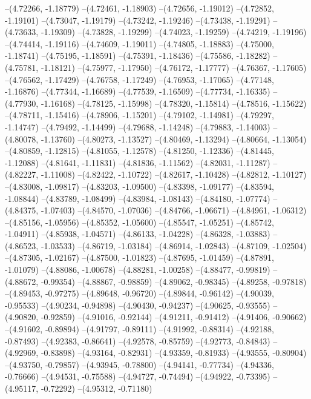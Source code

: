--(4.72266, -1.18779)
--(4.72461, -1.18903)
--(4.72656, -1.19012)
--(4.72852, -1.19101)
--(4.73047, -1.19179)
--(4.73242, -1.19246)
--(4.73438, -1.19291)
--(4.73633, -1.19309)
--(4.73828, -1.19299)
--(4.74023, -1.19259)
--(4.74219, -1.19196)
--(4.74414, -1.19116)
--(4.74609, -1.19011)
--(4.74805, -1.18883)
--(4.75000, -1.18741)
--(4.75195, -1.18591)
--(4.75391, -1.18436)
--(4.75586, -1.18282)
--(4.75781, -1.18121)
--(4.75977, -1.17950)
--(4.76172, -1.17777)
--(4.76367, -1.17605)
--(4.76562, -1.17429)
--(4.76758, -1.17249)
--(4.76953, -1.17065)
--(4.77148, -1.16876)
--(4.77344, -1.16689)
--(4.77539, -1.16509)
--(4.77734, -1.16335)
--(4.77930, -1.16168)
--(4.78125, -1.15998)
--(4.78320, -1.15814)
--(4.78516, -1.15622)
--(4.78711, -1.15416)
--(4.78906, -1.15201)
--(4.79102, -1.14981)
--(4.79297, -1.14747)
--(4.79492, -1.14499)
--(4.79688, -1.14248)
--(4.79883, -1.14003)
--(4.80078, -1.13760)
--(4.80273, -1.13527)
--(4.80469, -1.13294)
--(4.80664, -1.13054)
--(4.80859, -1.12815)
--(4.81055, -1.12578)
--(4.81250, -1.12336)
--(4.81445, -1.12088)
--(4.81641, -1.11831)
--(4.81836, -1.11562)
--(4.82031, -1.11287)
--(4.82227, -1.11008)
--(4.82422, -1.10722)
--(4.82617, -1.10428)
--(4.82812, -1.10127)
--(4.83008, -1.09817)
--(4.83203, -1.09500)
--(4.83398, -1.09177)
--(4.83594, -1.08844)
--(4.83789, -1.08499)
--(4.83984, -1.08143)
--(4.84180, -1.07774)
--(4.84375, -1.07403)
--(4.84570, -1.07036)
--(4.84766, -1.06671)
--(4.84961, -1.06312)
--(4.85156, -1.05956)
--(4.85352, -1.05600)
--(4.85547, -1.05251)
--(4.85742, -1.04911)
--(4.85938, -1.04571)
--(4.86133, -1.04228)
--(4.86328, -1.03883)
--(4.86523, -1.03533)
--(4.86719, -1.03184)
--(4.86914, -1.02843)
--(4.87109, -1.02504)
--(4.87305, -1.02167)
--(4.87500, -1.01823)
--(4.87695, -1.01459)
--(4.87891, -1.01079)
--(4.88086, -1.00678)
--(4.88281, -1.00258)
--(4.88477, -0.99819)
--(4.88672, -0.99354)
--(4.88867, -0.98859)
--(4.89062, -0.98345)
--(4.89258, -0.97818)
--(4.89453, -0.97275)
--(4.89648, -0.96720)
--(4.89844, -0.96142)
--(4.90039, -0.95533)
--(4.90234, -0.94898)
--(4.90430, -0.94237)
--(4.90625, -0.93555)
--(4.90820, -0.92859)
--(4.91016, -0.92144)
--(4.91211, -0.91412)
--(4.91406, -0.90662)
--(4.91602, -0.89894)
--(4.91797, -0.89111)
--(4.91992, -0.88314)
--(4.92188, -0.87493)
--(4.92383, -0.86641)
--(4.92578, -0.85759)
--(4.92773, -0.84843)
--(4.92969, -0.83898)
--(4.93164, -0.82931)
--(4.93359, -0.81933)
--(4.93555, -0.80904)
--(4.93750, -0.79857)
--(4.93945, -0.78800)
--(4.94141, -0.77734)
--(4.94336, -0.76666)
--(4.94531, -0.75588)
--(4.94727, -0.74494)
--(4.94922, -0.73395)
--(4.95117, -0.72292)
--(4.95312, -0.71180)
